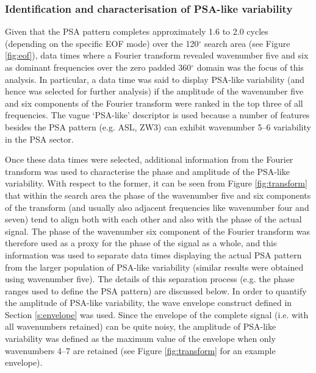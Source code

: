 \subsubsection{Identification and characterisation of PSA-like variability}

Given that the PSA pattern completes approximately 1.6 to 2.0 cycles (depending on the specific EOF mode) over the 120$^{\circ}$ search area (see Figure \ref{fig:eof}), data times where a Fourier transform revealed wavenumber five and six as dominant frequencies over the zero padded 360$^{\circ}$ domain was the focus of this analysis. In particular, a data time was said to display PSA-like variability (and hence was selected for further analysis) if the amplitude of the wavenumber five and six components of the Fourier transform were ranked in the top three of all frequencies. The vague `PSA-like' descriptor is used because a number of features besides the PSA pattern (e.g. ASL, ZW3) can exhibit wavenumber 5--6 variability in the PSA sector.

Once these data times were selected, additional information from the Fourier transform was used to characterise the phase and amplitude of the PSA-like variability. With respect to the former, it can be seen from Figure \ref{fig:transform} that within the search area the phase of the wavenumber five and six components of the transform (and usually also adjacent frequencies like wavenumber four and seven) tend to align both with each other and also with the phase of the actual signal. The phase of the wavenumber six component of the Fourier transform was therefore used as a proxy for the phase of the signal as a whole, and this information was used to separate data times displaying the actual PSA pattern from the larger population of PSA-like variability (similar results were obtained using wavenumber five). The details of this separation process (e.g. the phase ranges used to define the PSA pattern) are discussed below. In order to quantify the amplitude of PSA-like variability, the wave envelope construct defined in Section \ref{s:envelope} was used. Since the envelope of the complete signal (i.e. with all wavenumbers retained) can be quite noisy, the amplitude of PSA-like variability was defined as the maximum value of the envelope when only wavenumbers 4--7 are retained (see Figure \ref{fig:transform} for an example envelope).

